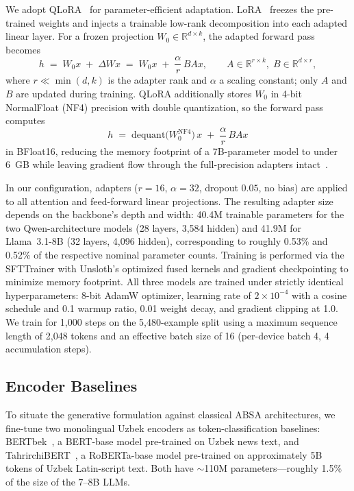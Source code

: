 \documentclass[bdcc,article,submit,moreauthors]{Definitions/mdpi}
\begin{document}
We adopt QLoRA~\cite{3666122.3666563} for parameter-efficient adaptation. LoRA~\cite{Hu2021-fz} freezes the pre-trained weights and injects a trainable low-rank decomposition into each adapted linear layer. For a frozen projection $W_0 \in \mathbb{R}^{d \times k}$, the adapted forward pass becomes
\begin{equation}
\label{eq:lora}
h \;=\; W_0 x \;+\; \Delta W x \;=\; W_0 x \;+\; \frac{\alpha}{r}\, B A x,
\qquad A \in \mathbb{R}^{r \times k},\; B \in \mathbb{R}^{d \times r},
\end{equation}
where $r \ll \min(d,k)$ is the adapter rank and $\alpha$ a scaling constant; only $A$ and $B$ are updated during training. QLoRA additionally stores $W_0$ in 4-bit NormalFloat (NF4) precision with double quantization, so the forward pass computes
\begin{equation}
\label{eq:qlora}
h \;=\; \mathrm{dequant}\big(W_0^{\mathrm{NF4}}\big)\, x \;+\; \frac{\alpha}{r}\, B A x
\end{equation}
in BFloat16, reducing the memory footprint of a 7B-parameter model to under 6~GB while leaving gradient flow through the full-precision adapters intact~\cite{3666122.3666563}.

In our configuration, adapters ($r{=}16$, $\alpha{=}32$, dropout $0.05$, no bias) are applied to all attention and feed-forward linear projections. The resulting adapter size depends on the backbone's depth and width: 40.4M trainable parameters for the two Qwen-architecture models (28 layers, 3{,}584 hidden) and 41.9M for Llama~3.1-8B (32 layers, 4{,}096 hidden), corresponding to roughly 0.53\% and 0.52\% of the respective nominal parameter counts. Training is performed via the SFTTrainer with Unsloth's optimized fused kernels and gradient checkpointing to minimize memory footprint. All three models are trained under strictly identical hyperparameters: 8-bit AdamW optimizer, learning rate of $2{\times}10^{-4}$ with a cosine schedule and 0.1 warmup ratio, 0.01 weight decay, and gradient clipping at 1.0. We train for 1{,}000 steps on the 5{,}480-example split using a maximum sequence length of 2{,}048 tokens and an effective batch size of 16 (per-device batch 4, 4 accumulation steps).
\subsection{Encoder Baselines}
\label{sec:meth_encoder}

To situate the generative formulation against classical ABSA architectures, we fine-tune two monolingual Uzbek encoders as token-classification baselines: BERTbek~\cite{kuriyozov-etal-2024-bertbek}, a BERT-base model pre-trained on Uzbek news text, and TahrirchiBERT~\cite{tahrirchibert2023}, a RoBERTa-base model pre-trained on approximately 5B tokens of Uzbek Latin-script text. Both have $\sim$110M parameters---roughly 1.5\% of the size of the 7--8B LLMs.
\end{document}
